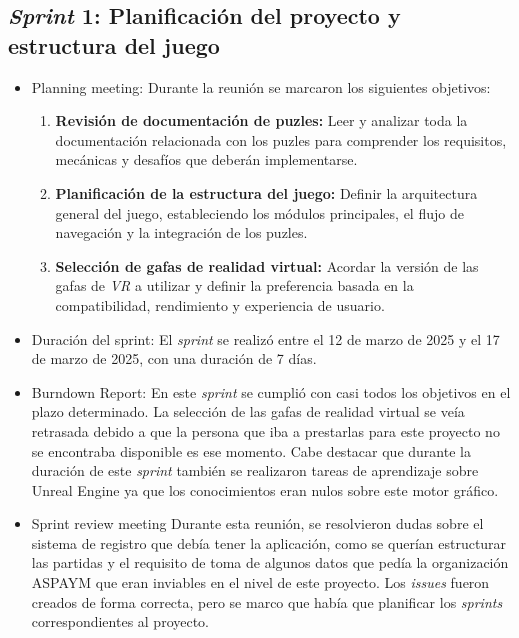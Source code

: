 \subsection{\textbf{\textit{Sprint} 1: Planificación del proyecto y estructura del juego}}
\begin{itemize}
\item {Planning meeting}:
Durante la reunión se marcaron los siguientes objetivos:

\begin{enumerate}
\item \textbf{Revisión de documentación de puzles:}
  Leer y analizar toda la documentación relacionada con los puzles para comprender los requisitos,  
  mecánicas y desafíos que deberán implementarse.

\item \textbf{Planificación de la estructura del juego:}
  Definir la arquitectura general del juego, estableciendo los módulos  
  principales, el flujo de navegación y la integración de los puzles.

\item \textbf{Selección de gafas de realidad virtual:}
  Acordar la versión de las gafas de \textit{VR} a utilizar y definir la  
  preferencia basada en la compatibilidad, rendimiento y experiencia de usuario.
\end{enumerate}

    \item {Duración del sprint:}
El \textit{sprint} se realizó entre el 12 de marzo de 2025 y el 17 de marzo de 2025, con una duración de 7 días.

    \item {Burndown Report:}
En este \textit{sprint} se cumplió con casi todos los objetivos en el plazo determinado. La selección de las gafas de realidad virtual se veía retrasada debido a que la persona que iba a prestarlas para este proyecto no se encontraba disponible es ese momento. Cabe destacar que durante la duración de este \textit{sprint} también se realizaron tareas de aprendizaje sobre Unreal Engine ya que los conocimientos eran nulos sobre este motor gráfico. 

    \item {Sprint review meeting}
Durante esta reunión, se resolvieron  dudas sobre el sistema de registro que debía tener la aplicación, como se querían estructurar las partidas y el requisito de toma de algunos datos que pedía la organización ASPAYM que eran inviables en el nivel de este proyecto. Los \textit{issues} fueron creados de forma correcta, pero se marco que había que planificar los \textit{sprints} correspondientes al proyecto.
\end{itemize}
